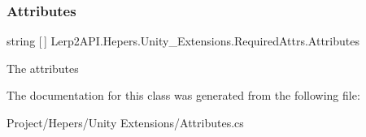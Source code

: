 \subsubsection{\texorpdfstring{Attributes}{Attributes}}
{\footnotesize\ttfamily string \mbox{[}$\,$\mbox{]} Lerp2\+A\+P\+I.\+Hepers.\+Unity\+\_\+\+Extensions.\+Required\+Attrs.\+Attributes}



The attributes 



The documentation for this class was generated from the following file\+:\begin{DoxyCompactItemize}
\item 
Project/\+Hepers/\+Unity Extensions/Attributes.\+cs\end{DoxyCompactItemize}
